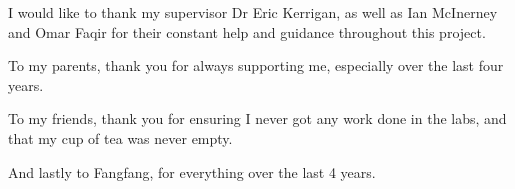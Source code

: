 \vspace*{\fill}

I would like to thank my supervisor Dr Eric Kerrigan, as well as Ian McInerney and Omar Faqir for their constant help and guidance throughout this project.

To my parents, thank you for always supporting me, especially over the last four years.

To my friends, thank you for ensuring I never got any work done in the labs, and that my cup of tea was never empty.

And lastly to Fangfang, for everything over the last 4 years.

\vspace*{\fill}